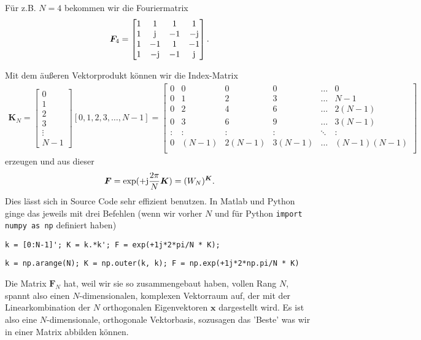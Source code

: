 \noindent Für z.B. $N=4$ bekommen wir die Fouriermatrix
\begin{align}
\bm{F}_4 =
\begin{bmatrix}
1 & 1 & 1 & 1 \\
1 & \im & -1 & -\im \\
1 & -1 & 1 & -1 \\
1 & -\im & -1 & \im
\end{bmatrix}.
\end{align}

Mit dem äußeren Vektorprodukt können wir die Index-Matrix
\begin{align}
\bm{K}_N =
\begin{bmatrix}
0\\1\\2\\3\\\vdots\\N-1
\end{bmatrix}
[0,1,2,3,\dots,N-1]
=
\begin{bmatrix}
0 & 0 & 0 & 0 & \dots & 0\\
0 & 1 & 2 & 3 & \dots & N-1\\
0 & 2 & 4 & 6 & \dots & 2(N-1)\\
0 & 3 & 6 & 9 & \dots & 3(N-1)\\
: & : & : & : & \ddots & :\\
0 & (N-1) & 2(N-1) & 3(N-1) & \dots & (N-1)(N-1)\\
\end{bmatrix}
\end{align}
erzeugen und aus dieser
\begin{align}
\bm{F} = \exp(+\im\frac{2\pi}{N} \bm{K}) = (W_N)^{\bm{K}}.
\end{align}
Dies lässt sich in Source Code sehr effizient benutzen. In Matlab und Python
ginge das jeweils mit drei Befehlen (wenn wir vorher $N$ und
für Python \texttt{import numpy as np} definiert haben)

\verb|k = [0:N-1]'; K = k.*k'; F = exp(+1j*2*pi/N * K);|

\verb|k = np.arange(N); K = np.outer(k, k); F = np.exp(+1j*2*np.pi/N * K)|

\noindent Die Matrix $\bm{F}_N$ hat, weil wir sie so zusammengebaut haben,
vollen Rang $N$, spannt also einen $N$-dimensionalen, komplexen Vektorraum auf,
der mit der Linearkombination der $N$ orthogonalen Eigenvektoren $\bm{x}$
dargestellt wird. Es ist also eine $N$-dimensionale, orthogonale Vektorbasis,
sozusagen das 'Beste' was wir in einer Matrix abbilden können.
%

